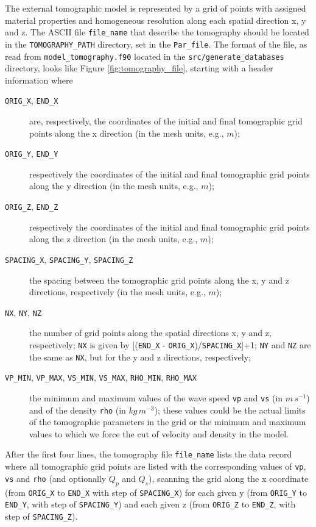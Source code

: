 The external tomographic model is represented by a grid of points
with assigned material properties and homogeneous resolution along
each spatial direction x, y and z. The ASCII file \texttt{file\_name}
that describe the tomography should be located in the \texttt{TOMOGRAPHY\_PATH}
directory, set in the \texttt{Par\_file}. The format of the file,
as read from \texttt{model\_tomography.f90} located in the \texttt{src/generate\_databases}
directory, looks like Figure \ref{fig:tomography_file}, starting with a header information where
\begin{description}
\item [{\texttt{ORIG\_X}, \texttt{END\_X}}] are, respectively, the coordinates
of the initial and final tomographic grid points along the x direction
(in the mesh units, e.g., $m$);
\item [{\texttt{ORIG\_Y}, \texttt{END\_Y}}] respectively the coordinates
of the initial and final tomographic grid points along the y direction
(in the mesh units, e.g., $m$);
\item [{\texttt{ORIG\_Z}, \texttt{END\_Z}}] respectively the coordinates
of the initial and final tomographic grid points along the z direction
(in the mesh units, e.g., $m$);
\item [{\texttt{SPACING\_X}, \texttt{SPACING\_Y}, \texttt{SPACING\_Z}}] the
spacing between the tomographic grid points along the x, y and z directions,
respectively (in the mesh units, e.g., $m$);
\item [{\texttt{NX}, \texttt{NY}, \texttt{NZ}}] the number of grid points
along the spatial directions x, y and z, respectively; \texttt{NX}
is given by {[}(\texttt{END\_X} - \texttt{ORIG\_X})/\texttt{SPACING\_X}{]}+1;
\texttt{NY} and \texttt{NZ} are the same as \texttt{NX}, but for the
y and z directions, respectively;
\item [{\texttt{VP\_MIN}, \texttt{VP\_MAX}, \texttt{VS\_MIN}, \texttt{VS\_MAX}, \texttt{RHO\_MIN}, \texttt{RHO\_MAX}}] the
minimum and maximum values of the wave speed \texttt{vp} and \texttt{vs}
(in $m\, s^{-1}$) and of the density \texttt{rho} (in $kg\, m^{-3}$);
these values could be the actual limits of the tomographic parameters
in the grid or the minimum and maximum values to which we force the
cut of velocity and density in the model.
\end{description}
After the first four lines, the tomography file \texttt{file\_name} lists the data record where all tomographic
grid points are listed with the corresponding values of \texttt{vp},
\texttt{vs} and \texttt{rho} (and optionally $Q_{p}$ and $Q_{s}$), scanning the grid along the x coordinate
(from \texttt{ORIG\_X} to \texttt{END\_X} with step of \texttt{SPACING\_X})
for each given y (from \texttt{ORIG\_Y} to \texttt{END\_Y}, with step
of \texttt{SPACING\_Y}) and each given z (from \texttt{ORIG\_Z} to
\texttt{END\_Z}, with step of \texttt{SPACING\_Z}).

